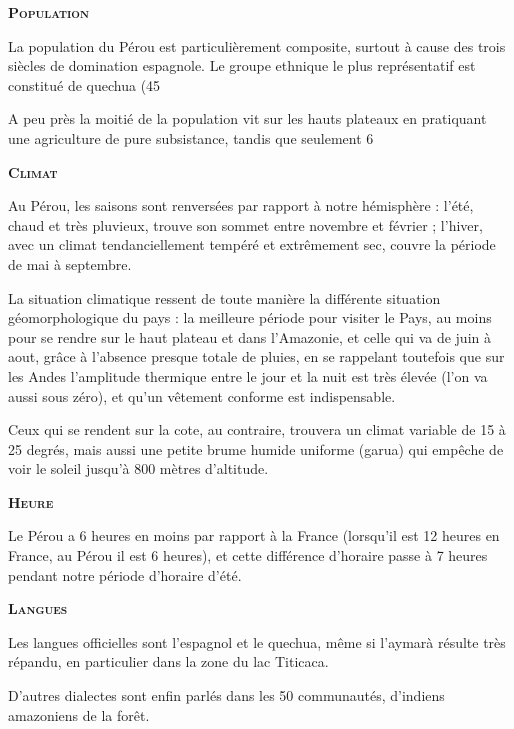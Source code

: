 \begin{multicols}{2}
\textbf{\textsc{Population}}

La population du Pérou est particulièrement composite, surtout à cause des trois siècles de domination espagnole. Le groupe ethnique le plus représentatif est constitué de quechua (45%

A peu près la moitié de la population vit sur les hauts plateaux en pratiquant une agriculture de pure subsistance, tandis que seulement 6%

\textbf{\textsc{Climat}}

Au Pérou, les saisons sont renversées par rapport à notre hémisphère : l'été, chaud et très pluvieux, trouve son sommet entre novembre et février ; l'hiver, avec un climat tendanciellement tempéré et extrêmement sec, couvre la période de mai à septembre.

La situation climatique ressent de toute manière la différente situation géomorphologique du pays : la meilleure période pour visiter le Pays, au moins pour se rendre sur le haut plateau et dans l'Amazonie, et celle qui va de juin à aout, grâce à l'absence presque totale de pluies, en se rappelant toutefois que sur les Andes l'amplitude thermique entre le jour et la nuit est très élevée (l'on va aussi sous zéro), et qu'un vêtement conforme est indispensable.

Ceux qui se rendent sur la cote, au contraire, trouvera un climat variable de 15 à 25 degrés, mais aussi une petite brume humide uniforme (garua) qui empêche de voir le soleil jusqu'à 800 mètres d'altitude.

\textbf{\textsc{Heure}}

Le Pérou a 6 heures en moins par rapport à la France (lorsqu'il est 12 heures en France, au Pérou il est 6 heures), et cette différence d'horaire passe à 7 heures pendant notre période d'horaire d'été.

\textbf{\textsc{Langues}}

Les langues officielles sont l'espagnol et le quechua, même si l'aymarà résulte très répandu, en particulier dans la zone du lac Titicaca.

D'autres dialectes sont enfin parlés dans les 50 communautés, d'indiens amazoniens de la forêt.


\end{multicols}
